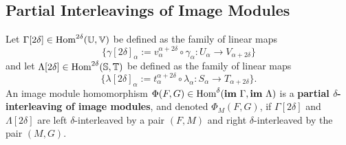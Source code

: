 \subsection{Partial Interleavings of Image Modules}

Let $\Gamma[2\delta]\in\text{Hom}^{2\delta}(\mathbb{U},\mathbb{V})$ be defined as the family of linear maps
\[\{\gamma[2\delta]_\alpha := v_{\alpha}^{\alpha+2\delta}\circ\gamma_{\alpha} : U_\alpha\to V_{\alpha+2\delta}\}\]
and let $\Lambda[2\delta]\in\text{Hom}^{2\delta}(\mathbb{S},\mathbb{T})$ be defined as the family of linear maps
\[\{\lambda[2\delta]_\alpha := t_{\alpha}^{\alpha+2\delta}\circ\lambda_\alpha : S_\alpha\to T_{\alpha+2\delta}\}.\]
An image module homomorphism $\Phi(F, G)\in\text{Hom}^\delta(\mathbf{im}~\Gamma,\mathbf{im}~\Lambda)$ is a \textbf{partial $\delta$-interleaving of image modules}, and denoted $\Phi_M(F, G)$, if $\Gamma[2\delta]$ and $\Lambda[2\delta]$ are left $\delta$-interleaved by a pair $(F, M)$ and right $\delta$-interleaved by the pair $(M, G)$.

